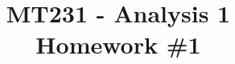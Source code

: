 \documentclass[12pt]{article} %
\title{
    \vspace{2in}
        \textmd{\textbf{MT231 - Analysis 1}}\\
    \vspace{1in}
    \textmd{\textbf{Homework \#1}}\\
    \vspace{1in}
}
\author{
    \hmwkAuthorName\\
    \hmwkStudentnum
}
\date{}
\begin{document}
\maketitle

\pagebreak

\begin{homeworkProblem}

\end{homeworkProblem}

\pagebreak

\begin{homeworkProblem}

\end{homeworkProblem}
\end{document}
